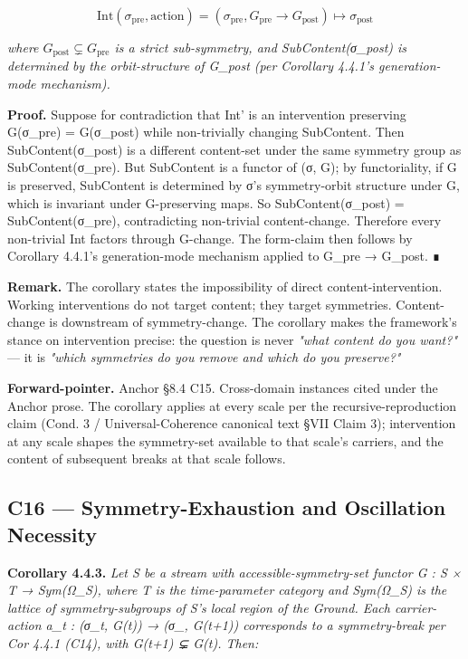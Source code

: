 \documentclass[11pt, openany]{book}
\begin{document}
\[
\mathrm{Int}(\sigma_{\mathrm{pre}}, \mathrm{action}) = (\sigma_{\mathrm{pre}}, G_{\mathrm{pre}} \to G_{\mathrm{post}}) \mapsto \sigma_{\mathrm{post}}
\]

\textit{where $G_\mathrm{post} \subsetneq G_\mathrm{pre}$ is a strict sub-symmetry, and SubContent(σ\_\allowbreak{}post) is determined by the orbit-structure of G\_\allowbreak{}post (per Corollary 4.4.1's generation-mode mechanism).}

\textbf{Proof.} Suppose for contradiction that Int' is an intervention preserving G(σ\_\allowbreak{}pre) = G(σ\_\allowbreak{}post) while non-trivially changing SubContent. Then SubContent(σ\_\allowbreak{}post) is a different content-set under the same symmetry group as SubContent(σ\_\allowbreak{}pre). But SubContent is a functor of (σ, G); by functoriality, if G is preserved, SubContent is determined by σ's symmetry-orbit structure under G, which is invariant under G-preserving maps. So SubContent(σ\_\allowbreak{}post) = SubContent(σ\_\allowbreak{}pre), contradicting non-trivial content-change. Therefore every non-trivial Int factors through G-change. The form-claim then follows by Corollary 4.4.1's generation-mode mechanism applied to G\_\allowbreak{}pre → G\_\allowbreak{}post. ∎

\textbf{Remark.} The corollary states the impossibility of direct content-intervention. Working interventions do not target content; they target symmetries. Content-change is downstream of symmetry-change. The corollary makes the framework's stance on intervention precise: the question is never \textit{"what content do you want?"} --- it is \textit{"which symmetries do you remove and which do you preserve?"}

\textbf{Forward-pointer.} Anchor §8.4 C15. Cross-domain instances cited under the Anchor prose. The corollary applies at every scale per the recursive-reproduction claim (Cond. 3 / Universal-Coherence canonical text §VII Claim 3); intervention at any scale shapes the symmetry-set available to that scale's carriers, and the content of subsequent breaks at that scale follows.

\subsection{C16 --- Symmetry-Exhaustion and Oscillation Necessity}

\textbf{Corollary 4.4.3.} \textit{Let S be a stream with accessible-symmetry-set functor G : S × T → Sym(Ω\_\allowbreak{}S), where T is the time-parameter category and Sym(Ω\_\allowbreak{}S) is the lattice of symmetry-subgroups of S's local region of the Ground. Each carrier-action a\_\allowbreak{}t : (σ\_\allowbreak{}t, G(t)) → (σ\_, G(t+1)) corresponds to a symmetry-break per Cor 4.4.1 (C14), with G(t+1) ⊊ G(t). Then:}
\end{document}
